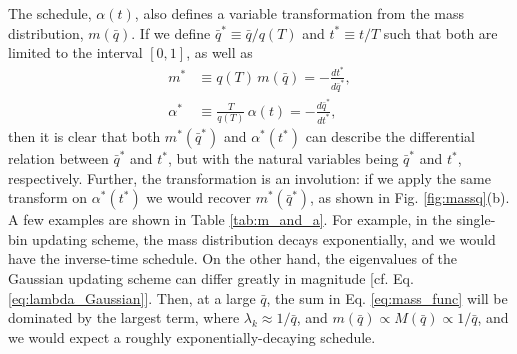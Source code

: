 \documentclass[reprint, superscriptaddress, floatfix]{revtex4-1}
\begin{document}
The schedule, $\alpha(t)$,
also defines a variable transformation from
the mass distribution, $m(\bar q)$.
%
If we define
$\bar q^* \equiv \bar q/q(T)$
and $t^* \equiv t/T$
such that both are limited to the interval $[0, 1]$,
as well as
\begin{align*}
  m^*       &\equiv q(T) \, m(\bar q) = -\frac{ dt^* } { d\bar q^* },
  \\
  \alpha^*  &\equiv \frac{T}{q(T)} \, \alpha(t) = -\frac{ d\bar q^* } { dt^* },
\end{align*}
then it is clear that
both $m^*(\bar q^*)$ and $\alpha^*(t^*)$
can describe the differential relation
between $\bar q^*$ and $t^*$,
but with the natural variables
being $\bar q^*$ and $t^*$, respectively.
%
Further, the transformation is an involution:
if we apply the same transform on $\alpha^*(t^*)$
we would recover $m^*(\bar q^*)$,
as shown in Fig. \ref{fig:massq}(b).
%
A few examples are shown in Table \ref{tab:m_and_a}.
%
For example, in the single-bin updating scheme,
the mass distribution decays exponentially,
and we would have the inverse-time schedule.
%
On the other hand,
the eigenvalues of the Gaussian updating scheme
can differ greatly in magnitude
[cf. Eq. \eqref{eq:lambda_Gaussian}].
%
Then, at a large $\bar q$,
the sum in Eq. \eqref{eq:mass_func} will be dominated by
the largest term, where $\lambda_k \approx 1/\bar q$,
and $m(\bar q) \propto M(\bar q) \propto 1/\bar q$,
and we would expect a roughly exponentially-decaying schedule.
\end{document}
